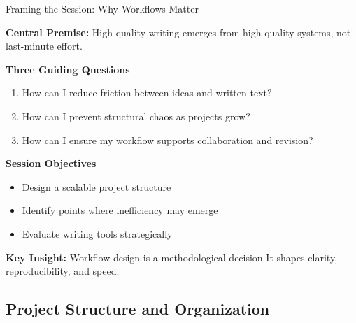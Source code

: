 \documentclass{beamer}
\begin{document}
\begin{frame}{Framing the Session: Why Workflows Matter}

\small

\textbf{Central Premise:}
    High-quality writing emerges from high-quality systems, not last-minute effort.


\vspace{0.5em}

\textbf{Three Guiding Questions}
\begin{enumerate}
    \item How can I reduce friction between ideas and written text?
    \item How can I prevent structural chaos as projects grow?
    \item How can I ensure my workflow supports collaboration and revision?
\end{enumerate}

\vspace{0.5em}

\textbf{Session Objectives}
\begin{itemize}
    \item Design a scalable project structure
    \item Identify points where inefficiency may emerge
    \item Evaluate writing tools strategically
\end{itemize}

\vspace{0.5em}

\begin{block}{\textbf{Key Insight:} Workflow design is a methodological decision }
    It shapes clarity, reproducibility, and speed.
\end{block}

\end{frame}


\subsection{Project Structure and Organization}
\end{document}
